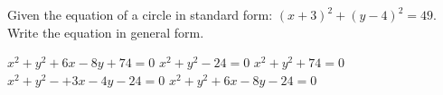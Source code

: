 \documentclass[11pt,answers]{exam}
\begin{document}
\begin{questions}
\begin{minipage}{\linewidth}
\begin{choices}
	\CorrectChoice {}
	\choice {}
	\choice {}
	\choice {}
\end{choices} \answerline
\vspace{0.5in}

\end{minipage}
\begin{minipage}{\linewidth}
\question[3] Given the equation of a circle in standard form: $(x + 3)^2 + (y - 4)^2 = 49$. Write the equation in general form.
\vspace{1ex}
\begin{choices}
	\choice $x^2+y^2+6x-8y+74=0$
	\choice $x^2+y^2-24=0$
	\choice $x^2+y^2+74 = 0$
	\choice $x^2+y^2-+3x-4y-24=0$
	\CorrectChoice $x^2+y^2+6x-8y-24=0$
\end{choices} \answerline
\vspace{0.5in}

\end{minipage}
\end{questions}
\end{document}
